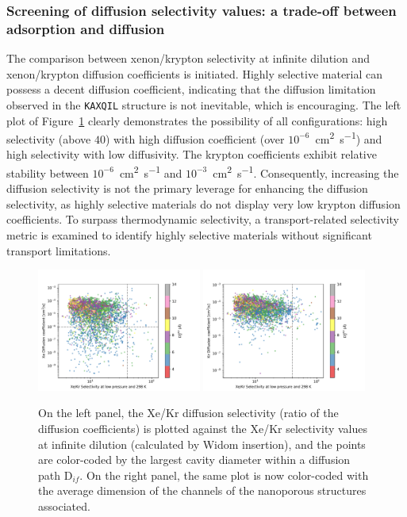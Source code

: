 \documentclass[main]{subfiles}
\begin{document}
\subsubsection{Screening of diffusion selectivity values: a trade-off between adsorption and diffusion}\label{sct:diff_screen}

The comparison between xenon/krypton selectivity at infinite dilution and xenon/krypton diffusion coefficients is initiated. Highly selective material can possess a decent diffusion coefficient, indicating that the diffusion limitation observed in the \texttt{KAXQIL} structure is not inevitable, which is encouraging. The left plot of Figure~\ref{fgr:diff_s0_lcd} clearly demonstrates the possibility of all configurations: high selectivity (above $40$) with high diffusion coefficient (over $10^{-6}$~\si{\square\cm\per\s}) and high selectivity with low diffusivity. The krypton coefficients exhibit relative stability between $10^{-6}$~\si{\square\cm\per\s} and $10^{-3}$~\si{\square\cm\per\s}. Consequently, increasing the diffusion selectivity is not the primary leverage for enhancing the diffusion selectivity, as highly selective materials do not display very low krypton diffusion coefficients. To surpass thermodynamic selectivity, a transport-related selectivity metric is examined to identify highly selective materials without significant transport limitations.

\begin{figure}[ht]
  \centering
    \includegraphics[width=0.48\textwidth]{figures/5-diffusion/D_xe-s0-lcd.pdf}
    \includegraphics[width=0.48\textwidth]{figures/5-diffusion/D_kr-s0-lcd.pdf}
    \caption{On the left panel, the Xe/Kr diffusion selectivity (ratio of the diffusion coefficients) is plotted against the Xe/Kr selectivity values at infinite dilution (calculated by Widom insertion), and the points are color-coded by the largest cavity diameter within a diffusion path D$_{if}$. On the right panel, the same plot is now color-coded with the average dimension of the channels of the nanoporous structures associated. }\label{fgr:diff_s0_lcd}
\end{figure}
\end{document}
